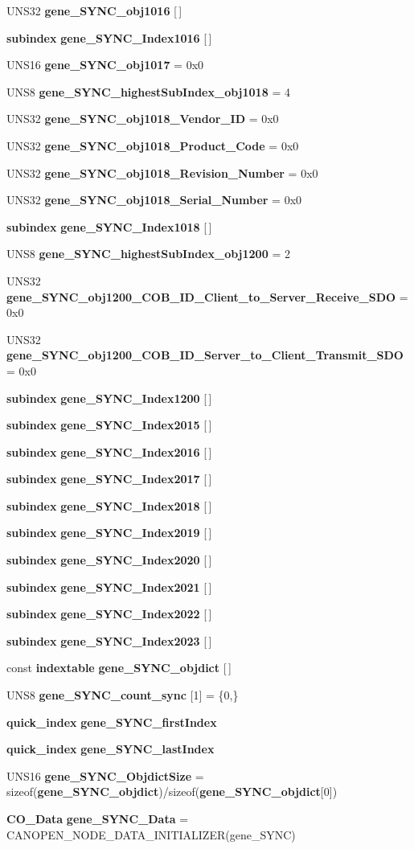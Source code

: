 \begin{CompactItemize}
\item 
UNS32 {\bf gene\_\-SYNC\_\-obj1016} [$\,$]
\item 
{\bf subindex} {\bf gene\_\-SYNC\_\-Index1016} [$\,$]
\item 
UNS16 {\bf gene\_\-SYNC\_\-obj1017} = 0x0
\item 
UNS8 {\bf gene\_\-SYNC\_\-highest\-Sub\-Index\_\-obj1018} = 4
\item 
UNS32 {\bf gene\_\-SYNC\_\-obj1018\_\-Vendor\_\-ID} = 0x0
\item 
UNS32 {\bf gene\_\-SYNC\_\-obj1018\_\-Product\_\-Code} = 0x0
\item 
UNS32 {\bf gene\_\-SYNC\_\-obj1018\_\-Revision\_\-Number} = 0x0
\item 
UNS32 {\bf gene\_\-SYNC\_\-obj1018\_\-Serial\_\-Number} = 0x0
\item 
{\bf subindex} {\bf gene\_\-SYNC\_\-Index1018} [$\,$]
\item 
UNS8 {\bf gene\_\-SYNC\_\-highest\-Sub\-Index\_\-obj1200} = 2
\item 
UNS32 {\bf gene\_\-SYNC\_\-obj1200\_\-COB\_\-ID\_\-Client\_\-to\_\-Server\_\-Receive\_\-SDO} = 0x0
\item 
UNS32 {\bf gene\_\-SYNC\_\-obj1200\_\-COB\_\-ID\_\-Server\_\-to\_\-Client\_\-Transmit\_\-SDO} = 0x0
\item 
{\bf subindex} {\bf gene\_\-SYNC\_\-Index1200} [$\,$]
\item 
{\bf subindex} {\bf gene\_\-SYNC\_\-Index2015} [$\,$]
\item 
{\bf subindex} {\bf gene\_\-SYNC\_\-Index2016} [$\,$]
\item 
{\bf subindex} {\bf gene\_\-SYNC\_\-Index2017} [$\,$]
\item 
{\bf subindex} {\bf gene\_\-SYNC\_\-Index2018} [$\,$]
\item 
{\bf subindex} {\bf gene\_\-SYNC\_\-Index2019} [$\,$]
\item 
{\bf subindex} {\bf gene\_\-SYNC\_\-Index2020} [$\,$]
\item 
{\bf subindex} {\bf gene\_\-SYNC\_\-Index2021} [$\,$]
\item 
{\bf subindex} {\bf gene\_\-SYNC\_\-Index2022} [$\,$]
\item 
{\bf subindex} {\bf gene\_\-SYNC\_\-Index2023} [$\,$]
\item 
const {\bf indextable} {\bf gene\_\-SYNC\_\-objdict} [$\,$]
\item 
UNS8 {\bf gene\_\-SYNC\_\-count\_\-sync} [1] = \{0,\}
\item 
{\bf quick\_\-index} {\bf gene\_\-SYNC\_\-first\-Index}
\item 
{\bf quick\_\-index} {\bf gene\_\-SYNC\_\-last\-Index}
\item 
UNS16 {\bf gene\_\-SYNC\_\-Objdict\-Size} = sizeof({\bf gene\_\-SYNC\_\-objdict})/sizeof({\bf gene\_\-SYNC\_\-objdict}[0])
\item 
{\bf CO\_\-Data} {\bf gene\_\-SYNC\_\-Data} = CANOPEN\_\-NODE\_\-DATA\_\-INITIALIZER(gene\_\-SYNC)
\end{CompactItemize}


